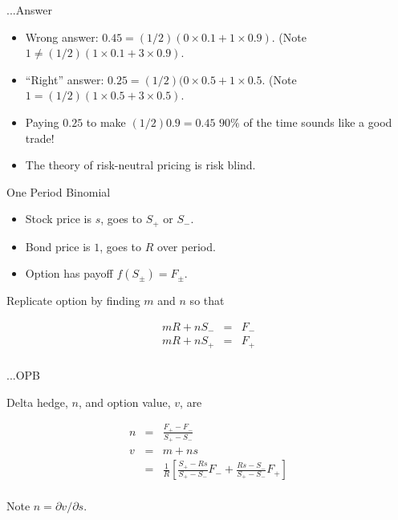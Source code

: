 \documentclass[fleqn]{amsart}
\begin{document}
\begin{section}{{...}Answer}

\begin{itemize}

\item Wrong answer: $0.45 = (1/2)(0\times 0.1 + 1\times 0.9)$. (Note $1 \not=
(1/2)(1\times 0.1 + 3\times 0.9)$.

\item ``Right'' answer: $0.25 = (1/2)(0\times 0.5 + 1\times 0.5$. (Note $1 =
(1/2)(1\times 0.5 + 3\times 0.5)$.

\item Paying $0.25$ to make $(1/2)0.9 = 0.45$ $90\%$ of the time sounds like
a good trade!

\item The theory of risk-neutral pricing is risk blind.

\end{itemize}

\end{section}

\begin{section}{One Period Binomial}

\begin{itemize}

\item Stock price is $s$, goes to $S_+$ or $S_-$.

\item Bond price is $1$, goes to $R$ over period.

\item Option has payoff $f(S_\pm) = F_\pm$.

\end{itemize}

Replicate option by finding $m$ and $n$ so that

\begin{eqnarray*}
	mR + nS_- &=& F_-\\
	mR + nS_+ &=& F_+\\
\end{eqnarray*}

\end{section}

\begin{section}{{...}OPB}

Delta hedge, $n$, and option value, $v$, are

\begin{eqnarray*}
	n &=& \frac{F_+ - F_-}{S_+ - S_-} \\
	v &=& m + ns \\
	  &=& \frac{1}{R}\left[\frac{S_+ - Rs}{S_+ - S_-} F_-
		+ \frac{Rs - S_-}{S_+ - S_-} F_+\right] \\
\end{eqnarray*}

Note $n = \partial v/\partial s$.

\end{section}
\end{document}
